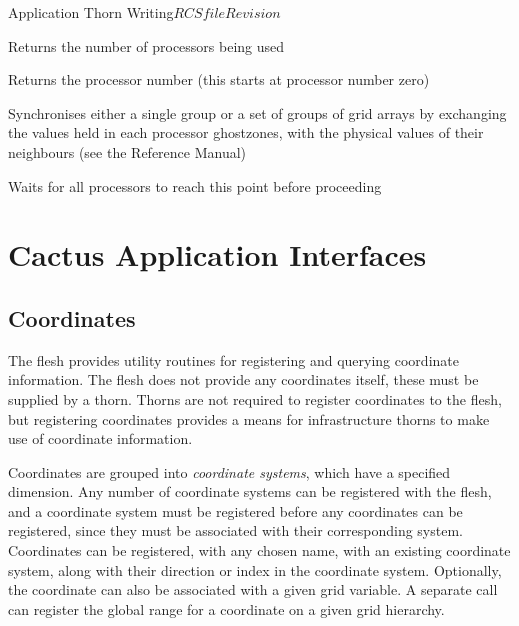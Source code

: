 \begin{cactuspart}{Application Thorn Writing}{$RCSfile$}{$Revision$}
\begin{Lentry}
\item[\texttt{CCTK\_nProcs}] Returns the number of processors being used
\item[\texttt{CCTK\_MyProc}] Returns the processor number (this starts at
  processor number zero)
\item[\texttt{CCTK\_SyncGroup, CCTK\_SyncGroupsI}] Synchronises either a single
  group or a set of groups of grid arrays by
  exchanging the values held in each processor ghostzones, with the
  physical values of their neighbours (see the Reference Manual)
\item[\texttt{CCTK\_Barrier}] Waits for all processors to reach this point
  before proceeding
\end{Lentry}


\chapter{Cactus Application Interfaces}


\section{Coordinates}
\label{sec:CactusAPI.coordinates}

The flesh provides utility routines for registering and querying
coordinate information. The flesh does not provide any coordinates
itself, these must be supplied by a thorn. Thorns are not required to
register coordinates to the flesh, but registering coordinates
provides a means for infrastructure thorns to make use of coordinate
information.

Coordinates are grouped into \textit{coordinate systems}, which have a
specified dimension. Any number of coordinate systems can be
registered with the flesh, and a coordinate system must be registered
before any coordinates can be registered, since they must be
associated with their corresponding system.  Coordinates can be
registered, with any chosen name, with an existing coordinate system,
along with their direction or index in the coordinate system.
Optionally, the coordinate can also be associated with a given grid
variable.  A separate call can register the global range for a
coordinate on a given grid hierarchy.


\end{cactuspart}
